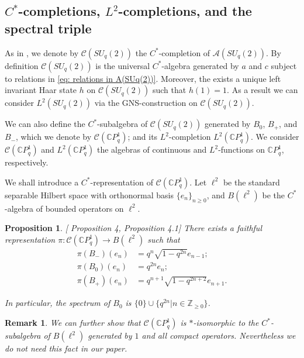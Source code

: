\documentclass[12pt]{article}
\newtheorem{remark}[definition]{Remark}
\newtheorem{proposition}[definition]{Proposition}
\numberwithin{equation}{section}
\def\Z{{\mathbb Z}}
\def\C{{\mathbb C}}
\begin{document}
\subsection{$C^*$-completions, $L^2$-completions, and the spectral triple}
As in \cite[Section 3.2]{khalkhali2011holomorphic}, we denote by $\mathcal{C}(SU_q(2))$ the $C^*$-completion of $\mathcal{A}(SU_q(2))$. By definition $\mathcal{C}(SU_q(2))$ is the universal $C^*$-algebra generated by $a$ and $c$ subject to relations in \eqref{eq: relations in A(SUq(2))}.
Moreover, the exists a unique left invariant Haar state $h$ on $\mathcal{C}(SU_q(2))$ such that $h(1)=1$. As a result we can consider  $L^2(SU_q(2))$ via the GNS-construction on $\mathcal{C}(SU_q(2))$.

We can also define the $C^*$-subalgebra of $\mathcal{C}(SU_q(2))$ generated by $B_0$, $B_+$, and $B_-$, which we denote by $\mathcal{C}(\C P^1_q)$; and its $L^2$-completion $L^2(\C P^1_q)$. We consider $\mathcal{C}(\C P^1_q)$ and $L^2(\C P^1_q)$ the algebras of continuous and $L^2$-functions on $\C P^1_q$, 
respectively.

We shall introduce a $C^*$-representation of $\mathcal{C}(\C P^1_q)$. Let $\ell^2$ be the standard separable Hilbert space with orthonormal basis $\{e_n\}_{n\geq 0}$, and $B(\ell^2)$ be the $C^*$-algebra of bounded operators on $\ell^2$.

\begin{proposition}\label{prop: standard representation}[\cite{podles1987quantum} Proposition 4, \cite{aguilar2018podles} Proposition 4.1]
There exists a faithful representation $\pi: \mathcal{C}(\C P^1_q)\to B(\ell^2)$ such that
  \begin{equation}\label{eq: standar representation}
    \begin{split}
        \pi(B_-)(e_n)&=q^{n}\sqrt{1-q^{2n}}e_{n-1};\\
        \pi(B_0)(e_n)&=q^{2n}e_n;\\
        \pi(B_+)(e_n)&=q^{n+1}\sqrt{1-q^{2n+2}}e_{n+1}.
    \end{split}
    \end{equation}

    In particular, the spectrum of $B_0$  is $\{0\} \cup \{q^{2n} | n \in \Z_{\geq 0} \}$.
\end{proposition}

\begin{remark}
We can further show that $\mathcal{C}(\C P^1_q)$ is $*$-isomorphic to the $C^*$-subalgebra of $B(\ell^2)$ generated by $1$ and all compact operators. Nevertheless we do not need this fact in our paper.
\end{remark} 
\end{document}
